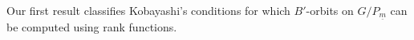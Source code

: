 \documentclass[pdftex]{sigma}
\numberwithin{equation}{section}
\theoremstyle{definition}
\theoremstyle{plain}
\theoremstyle{plain}
\theoremstyle{plain}
\newtheorem{theoremx}{Theorem}
\theoremstyle{plain}
\begin{document}
Our first result classifies Kobayashi's conditions for which $B'$-orbits on $G/P_{\underline m}$ can be computed using rank functions.

	
	
	
		
\end{document}
